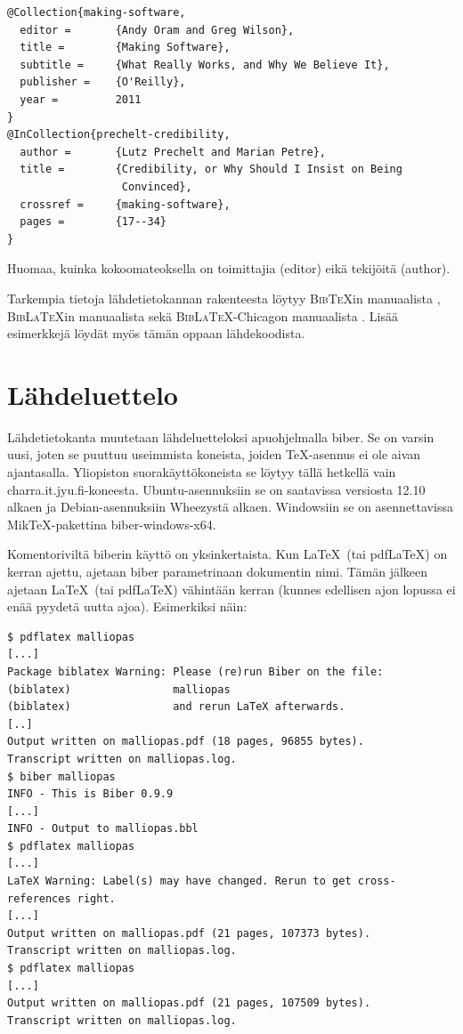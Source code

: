 \documentclass[utf8,bachelor]{gradu3}
\begin{document}
\begingroup\footnotesize
\begin{verbatim}
@Collection{making-software,
  editor =       {Andy Oram and Greg Wilson},
  title =        {Making Software},
  subtitle =     {What Really Works, and Why We Believe It},
  publisher =    {O'Reilly},
  year =         2011
}
@InCollection{prechelt-credibility,
  author =       {Lutz Prechelt and Marian Petre},
  title =        {Credibility, or Why Should I Insist on Being
                  Convinced},
  crossref =     {making-software},
  pages =        {17--34}
}
\end{verbatim}
\endgroup

Huomaa, kuinka kokoomateoksella on toimittajia (editor) eikä tekijöitä
(author).

Tarkempia tietoja lähdetietokannan rakenteesta löytyy
\textsc{Bib\TeX}in manuaalista \parencite{bibtexing},
\textsc{Bib\LaTeX}in manuaalista \parencite[luku~2]{biblatex-manual}
sekä \textsc{Bib\LaTeX}-Chicagon manuaalista
\parencite[luvut 5.1--5.2]{biblatex-chicago-manual}.  Lisää
esimerkkejä löydät myös tämän oppaan lähdekoodista.

\section{Lähdeluettelo}

Lähdetietokanta muutetaan lähdeluetteloksi apuohjelmalla {biber}.  Se
on varsin uusi, joten se puuttuu useimmista koneista, joiden
\TeX-asennus ei ole aivan ajantasalla.  Yliopiston suorakäyttökoneista
se löytyy tällä hetkellä vain charra.it.jyu.fi-koneesta.
Ubuntu-asennuksiin se on saatavissa versiosta 12.10 alkaen ja
Debian-asennuksiin Wheezystä alkaen.  Windowsiin se on asennettavissa
Mik\TeX-pakettina biber-windows-x64.

Komentoriviltä biberin käyttö on yksinkertaista.  Kun \LaTeX\ (tai
pdf\LaTeX) on kerran ajettu, ajetaan biber parametrinaan dokumentin
nimi.  Tämän jälkeen ajetaan \LaTeX\ (tai pdf\LaTeX) vähintään kerran
(kunnes edellisen ajon lopussa ei enää pyydetä uutta ajoa).
Esimerkiksi näin:

\begingroup\footnotesize
\begin{verbatim}
$ pdflatex malliopas
[...]
Package biblatex Warning: Please (re)run Biber on the file:
(biblatex)                malliopas
(biblatex)                and rerun LaTeX afterwards.
[..]
Output written on malliopas.pdf (18 pages, 96855 bytes).
Transcript written on malliopas.log.
$ biber malliopas
INFO - This is Biber 0.9.9
[...]
INFO - Output to malliopas.bbl
$ pdflatex malliopas
[...]
LaTeX Warning: Label(s) may have changed. Rerun to get cross-references right.
[...]
Output written on malliopas.pdf (21 pages, 107373 bytes).
Transcript written on malliopas.log.
$ pdflatex malliopas
[...]
Output written on malliopas.pdf (21 pages, 107509 bytes).
Transcript written on malliopas.log.
\end{verbatim}
\endgroup
\end{document}
